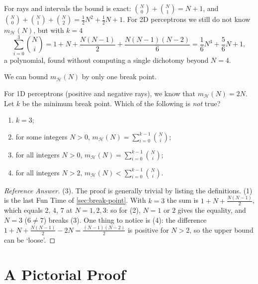 For rays and intervals the bound is exact: \(\binom{N}{0} + \binom{N}{1} = N +
1\), and \(\binom{N}{0} + \binom{N}{1} + \binom{N}{2} = \frac{1}{2} N^2 +
\frac{1}{2} N + 1\). For 2D perceptrons we still do not know
\(m_{\mathcal{H}}(N)\), but with \(k = 4\)
\[
    \sum_{i=0}^{3} \binom{N}{i}
    = 1 + N + \frac{N(N-1)}{2} + \frac{N(N-1)(N-2)}{6}
    = \frac{1}{6} N^3 + \frac{5}{6} N + 1 ,
\]
a polynomial, found without computing a single dichotomy beyond \(N = 4\).

\begin{moral}
    We can bound \(m_{\mathcal{H}}(N)\) by only one break point.
\end{moral}

\begin{exercise}
    For 1D perceptrons (positive and negative rays), we know that
    \(m_{\mathcal{H}}(N) = 2N\). Let \(k\) be the minimum break point. Which of
    the following is \emph{not} true?
    \begin{enumerate}[(1)]
        \item \(k = 3\);
        \item for some integers \(N > 0\), \(m_{\mathcal{H}}(N) =
            \sum_{i=0}^{k-1} \binom{N}{i}\);
        \item for all integers \(N > 0\), \(m_{\mathcal{H}}(N) =
            \sum_{i=0}^{k-1} \binom{N}{i}\);
        \item for all integers \(N > 2\), \(m_{\mathcal{H}}(N) <
            \sum_{i=0}^{k-1} \binom{N}{i}\).
    \end{enumerate}
\end{exercise}

\begin{proof}[Reference Answer]
    (3). The proof is generally trivial by listing the definitions. (1) is the
    last Fun Time of \autoref{sec:break-point}. With \(k = 3\) the sum is
    \(1 + N + \frac{N(N-1)}{2}\), which equals \(2\), \(4\), \(7\) at
    \(N = 1, 2, 3\): so for (2), \(N = 1\) or \(2\) gives the equality, and
    \(N = 3\) (\(6 \ne 7\)) breaks (3). One thing to notice is (4): the
    difference \(1 + N + \frac{N(N-1)}{2} - 2N = \frac{(N-1)(N-2)}{2}\) is
    positive for \(N > 2\), so the upper bound can be `loose'.
\end{proof}

\section{A Pictorial Proof}\label{sec:pictorial}


